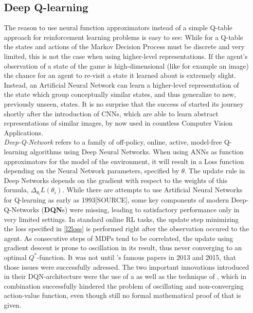 \subsection{Deep Q-learning}

\noindent The reason to use neural function approximators instead of a simple Q-table approach for reinforcement learning problems is easy to see: While for a Q-table the states and actions of the Markov Decision Process must be discrete and very limited, this is not the case when using higher-level representations. If the agent's observation of a state of the game is high-dimensional (like for example an image) the chance for an agent to re-visit a state it learned about is extremely slight. Instead, an Artificial Neural Network can learn a higher-level representation of the state which group conceptually similar states, and thus generalize to new, previously unseen, states. It is no surprise that the success of  started its journey shortly after the introduction of CNNs, which are able to learn abstract representations of similar images, by now used in countless Computer Vision Applications. \\%

\textit{Deep-Q-Network} refers to a family of off-policy, online, active, model-free Q-learning algorithms using Deep Neural Networks. %
When using ANNs as function approximators for the model of the environment, it will result in a Loss function depending on the Neural Network parameters, specified by $\theta$. The update rule in Deep Networks depends on the gradient with respect to the weights of this formula, $\Delta_{\theta_i}L(\theta_i)$.%
While there are attempts to use Artificial Neural Networks for Q-learning as early as 1993[SOURCE], some key components of modern Deep-Q-Networks (\textbf{DQN}s) were missing, leading to satisfactory performance only in very limited settings. In standard online RL tasks, the update step minimizing the loss specified in \ref{l2loss} is performed right after the observation occured to the agent. As consecutive steps of MDPs tend to be correlated, the update using gradient descent is prone to oscillation in its result, thus never converging to an optimal $Q^*$-function. It was not until 's famous papers in 2013\cite{mnih_playing_2013} and 2015\cite{mnih_human-level_2015}, that those issues were successfully adressed.
The two important innovations introduced in their DQN-architecture were the use of a  as well as the technique of , which in combination successfully hindered the problem of oscillating and non-converging action-value function, even though still no formal mathematical proof of that is given. %

